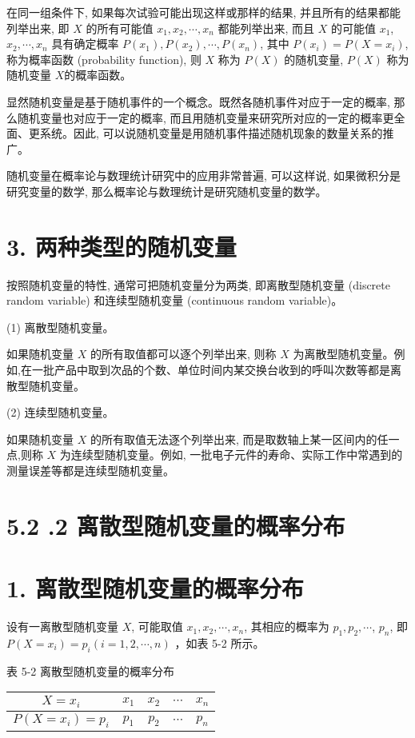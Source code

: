 \documentclass[10pt]{article}
\begin{document}
\begin{CJK*}{UTF8}{bsmi}
在同一组条件下, 如果每次试验可能出现这样或那样的结果, 并且所有的结果都能列举出来, 即 $X$ 的所有可能值 $x_{1}, x_{2}, \cdots, x_{n}$ 都能列举出来, 而且 $X$ 的可能值 $x_{1}$, $x_{2}, \cdots, x_{n}$ 具有确定概率 $P\left(x_{1}\right), P\left(x_{2}\right), \cdots, P\left(x_{n}\right)$, 其中 $P\left(x_{i}\right)=P\left(X=x_{i}\right)$, 称为概率函数 (probability function), 则 $X$ 称为 $P(X)$ 的随机变量, $P(X)$ 称为随机变量 $X$的概率函数。

显然随机变量是基于随机事件的一个概念。既然各随机事件对应于一定的概率, 那么随机变量也对应于一定的概率, 而且用随机变量来研究所对应的一定的概率更全面、更系统。因此, 可以说随机变量是用随机事件描述随机现象的数量关系的推广。

随机变量在概率论与数理统计研究中的应用非常普遍, 可以这样说, 如果微积分是研究变量的数学, 那么概率论与数理统计是研究随机变量的数学。

\section*{3. 两种类型的随机变量}
按照随机变量的特性, 通常可把随机变量分为两类, 即离散型随机变量 (discrete random variable) 和连续型随机变量 (continuous random variable)。

(1) 离散型随机变量。

如果随机变量 $X$ 的所有取值都可以逐个列举出来, 则称 $X$ 为离散型随机变量。例如,在一批产品中取到次品的个数、单位时间内某交换台收到的呼叫次数等都是离散型随机变量。

(2) 连续型随机变量。

如果随机变量 $X$ 的所有取值无法逐个列举出来, 而是取数轴上某一区间内的任一点,则称 $X$ 为连续型随机变量。例如, 一批电子元件的寿命、实际工作中常遇到的测量误差等都是连续型随机变量。

\section*{5.2 .2 离散型随机变量的概率分布}
\section*{1. 离散型随机变量的概率分布}
设有一离散型随机变量 $X$, 可能取值 $x_{1}, x_{2}, \cdots, x_{n}$, 其相应的概率为 $p_{1}, p_{2}, \cdots$, $p_{n}$, 即 $P\left(X=x_{i}\right)=p_{i}(i=1,2, \cdots, n)$ ，如表 5-2 所示。

表 5-2 离散型随机变量的概率分布

\begin{center}
\begin{tabular}{ccccc}
\hline
$X=x_{i}$ & $x_{1}$ & $x_{2}$ & $\cdots$ & $x_{n}$ \\
\hline
$P\left(X=x_{i}\right)=p_{i}$ & $p_{1}$ & $p_{2}$ & $\cdots$ & $p_{n}$ \\
\hline
\end{tabular}
\end{center}


\end{CJK*}
\end{document}
